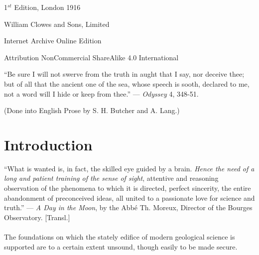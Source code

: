 \documentclass[a4paper, 12pt, oneside]{article}
\begin{document}
\begin{titlepage}
	
		
	\vspace*{\fill}%
	
	1$^{st}$ Edition, London 1916 %
	
	{\small William Clowes and Sons, Limited } %

	\vspace{1\baselineskip} %

    Internet Archive Online Edition  %
	
	{\small Attribution NonCommercial ShareAlike 4.0 International } %
\end{titlepage}
\setlength{\parskip}{1mm plus1mm minus1mm}
\setcounter{tocdepth}{3}
\setcounter{secnumdepth}{3}
\tableofcontents
\clearpage
\listoffigures{}
\clearpage
\begin{displayquote}
``Be sure I will not swerve from the truth in aught that I say, nor deceive thee; but of all that the ancient one of the sea, whose speech is sooth, declared to me, not a word will I hide or keep from thee.'' --- \emph{Odyssey} 4, 348-51.

(Done into English Prose by S. H. Butcher and A. Lang.)
\end{displayquote}
\clearpage
\section*{Introduction}
\begin{displayquote}
``What is wanted is, in fact, the skilled eye guided by a brain. \emph{Hence the need of a long and patient training of the sense of sight}, attentive and reasoning observation of the phenomena to which it is directed, perfect sincerity, the entire abandonment of preconceived ideas, all united to a passionate love for science and truth.'' --- \emph{A Day in the Moon}, by the Abbé Th. Moreux, Director of the Bourges Observatory. [Transl.]
\end{displayquote}
\paragraph{}
The foundations on which the stately edifice of modern geological science is supported are to a certain extent unsound, though easily to be made secure.
\end{document}
